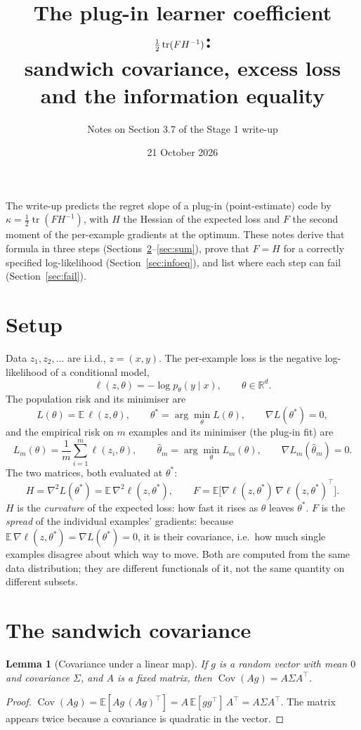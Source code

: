 \documentclass[11pt]{article}
\title{The plug-in learner coefficient $\tfrac12\tr(FH^{-1})$:\\ sandwich covariance, excess loss and the information equality}
\author{Notes on Section 3.7 of the Stage 1 write-up}
\date{21 October 2026}
\newtheorem{lemma}{Lemma}
\theoremstyle{remark}
\newcommand{\E}{\mathbb{E}}
\newcommand{\Cov}{\operatorname{Cov}}
\newcommand{\tr}{\operatorname{tr}}
\newcommand{\ts}{\theta^*}
\newcommand{\hth}{\hat\theta_m}
\begin{document}
\maketitle

\noindent The write-up predicts the regret slope of a plug-in (point-estimate) code by $\kappa=\tfrac12\tr(FH^{-1})$, with $H$ the Hessian of the expected loss and $F$ the second moment of the per-example gradients at the optimum. These notes derive that formula in three steps (Sections~\ref{sec:sandwich}--\ref{sec:sum}), prove that $F=H$ for a correctly specified log-likelihood (Section~\ref{sec:infoeq}), and list where each step can fail (Section~\ref{sec:fail}).

\section{Setup}

Data $z_1,z_2,\dots$ are i.i.d., $z=(x,y)$. The per-example loss is the negative log-likelihood of a conditional model,
\[
\ell(z,\theta)=-\log p_\theta(y\mid x),\qquad \theta\in\mathbb R^d .
\]
The population risk and its minimiser are
\[
L(\theta)=\E\,\ell(z,\theta),\qquad \ts=\arg\min_\theta L(\theta),\qquad \nabla L(\ts)=0,
\]
and the empirical risk on $m$ examples and its minimiser (the plug-in fit) are
\[
L_m(\theta)=\frac1m\sum_{i=1}^m\ell(z_i,\theta),\qquad \hth=\arg\min_\theta L_m(\theta),\qquad \nabla L_m(\hth)=0 .
\]
The two matrices, both evaluated at $\ts$:
\[
H=\nabla^2L(\ts)=\E\,\nabla^2\ell(z,\ts),\qquad
F=\E\bigl[\nabla\ell(z,\ts)\,\nabla\ell(z,\ts)^{\top}\bigr].
\]
$H$ is the \emph{curvature} of the expected loss: how fast it rises as $\theta$ leaves $\ts$. $F$ is the \emph{spread} of the individual examples' gradients: because $\E\,\nabla\ell(z,\ts)=\nabla L(\ts)=0$, it is their covariance, i.e.\ how much single examples disagree about which way to move. Both are computed from the same data distribution; they are different functionals of it, not the same quantity on different subsets.

\section{The sandwich covariance}
\label{sec:sandwich}

\begin{lemma}[Covariance under a linear map]\label{lem:lin}
If $g$ is a random vector with mean $0$ and covariance $\Sigma$, and $A$ is a fixed matrix, then $\Cov(Ag)=A\Sigma A^\top$.
\end{lemma}
\begin{proof}
$\Cov(Ag)=\E[Ag\,(Ag)^\top]=A\,\E[gg^\top]\,A^\top=A\Sigma A^\top$. The matrix appears twice because a covariance is quadratic in the vector.
\end{proof}
\end{document}
